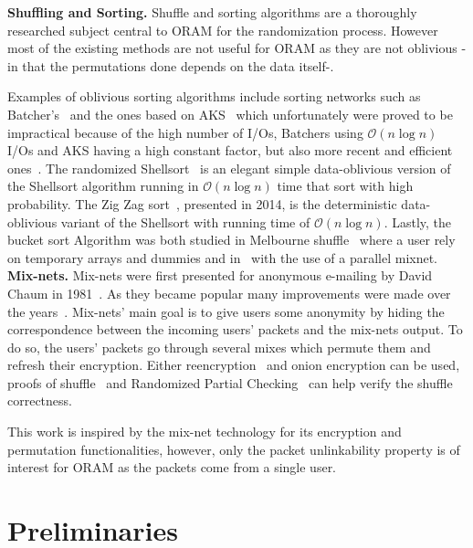 \documentclass[USenglish,oneside,twocolumn]{article}
\begin{document}
\noindent\textbf{Shuffling and Sorting.}
Shuffle and sorting algorithms are a thoroughly researched subject central to ORAM for the randomization process. However most of the existing methods are not useful for ORAM as they are not oblivious -in that the permutations done depends on the data itself-.

Examples of oblivious sorting algorithms include sorting networks such as Batcher's~\cite{batcher1968sorting} and the ones based on AKS~\cite{ajtai19830} which unfortunately were proved to be impractical because of the high number of I/Os, Batchers using $\mathcal{O}\left ( n \log n \right)$ I/Os and AKS having a high constant factor, but also more recent and efficient ones~\cite{paterson1990improved}.
The randomized Shellsort~\cite{goodrich2010randomized} is an elegant simple data-oblivious version of the Shellsort algorithm running in $\mathcal{O}\left ( n \log n \right)$ time that sort with high probability.
The Zig Zag sort~\cite{goodrich2014zig}, presented in 2014, is the deterministic data-oblivious variant of the Shellsort with running time of $\mathcal{O}\left ( n \log n\right)$.
Lastly, the bucket sort Algorithm was both studied in Melbourne shuffle~\cite{ohrimenko2014melbourne} where a user rely on temporary arrays and dummies and in~\cite{goodrich2012anonymous} with the use of a parallel mixnet.\\

\noindent\textbf{Mix-nets.}
Mix-nets were first presented for anonymous e-mailing by David Chaum in 1981~\cite{chaum1981untraceable}. As they became popular many improvements were made over the years~\cite{moller2003mixmaster,danezis2003mixminion,danezis2004minx,danezis2009sphinx}. Mix-nets' main goal is to give users some anonymity by hiding the correspondence between the incoming users' packets and the mix-nets output. To do so, the users' packets go through several mixes which permute them and refresh their encryption. Either reencryption~\cite{wikstrom2006adaptively} and onion encryption can be used, proofs of shuffle~\cite{groth2007verifiable,groth2007non,bayer2012efficient} and Randomized Partial Checking~\cite{jakobsson2002making} can help verify the shuffle correctness.

This work is inspired by the mix-net technology for its encryption and permutation functionalities, however, only the packet unlinkability property is of interest for ORAM as the packets come from a single user.
%
\section{Preliminaries}\label{Prelim}
%
\end{document}
